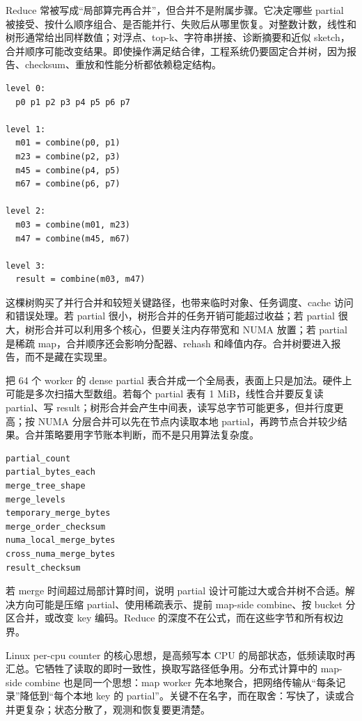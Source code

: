 Reduce 常被写成“局部算完再合并”，但合并不是附属步骤。它决定哪些 partial 被接受、按什么顺序组合、是否能并行、失败后从哪里恢复。对整数计数，线性和树形通常给出同样数值；对浮点、top-k、字符串拼接、诊断摘要和近似 sketch，合并顺序可能改变结果。即使操作满足结合律，工程系统仍要固定合并树，因为报告、checksum、重放和性能分析都依赖稳定结构。

\begin{lstlisting}[numbers=none,caption={8 个 partial 的固定树形合并}]
level 0:
  p0 p1 p2 p3 p4 p5 p6 p7

level 1:
  m01 = combine(p0, p1)
  m23 = combine(p2, p3)
  m45 = combine(p4, p5)
  m67 = combine(p6, p7)

level 2:
  m03 = combine(m01, m23)
  m47 = combine(m45, m67)

level 3:
  result = combine(m03, m47)
\end{lstlisting}

这棵树购买了并行合并和较短关键路径，也带来临时对象、任务调度、cache 访问和错误处理。若 partial 很小，树形合并的任务开销可能超过收益；若 partial 很大，树形合并可以利用多个核心，但要关注内存带宽和 NUMA 放置；若 partial 是稀疏 map，合并顺序还会影响分配器、rehash 和峰值内存。合并树要进入报告，而不是藏在实现里。

把 64 个 worker 的 dense partial 表合并成一个全局表，表面上只是加法。硬件上可能是多次扫描大型数组。若每个 partial 表有 1 MiB，线性合并要反复读 partial、写 result；树形合并会产生中间表，读写总字节可能更多，但并行度更高；按 NUMA 分层合并可以先在节点内读取本地 partial，再跨节点合并较少结果。合并策略要用字节账本判断，而不是只用算法复杂度。

\begin{lstlisting}[numbers=none,caption={partial 合并报告字段}]
partial_count
partial_bytes_each
merge_tree_shape
merge_levels
temporary_merge_bytes
merge_order_checksum
numa_local_merge_bytes
cross_numa_merge_bytes
result_checksum
\end{lstlisting}

若 merge 时间超过局部计算时间，说明 partial 设计可能过大或合并树不合适。解决方向可能是压缩 partial、使用稀疏表示、提前 map-side combine、按 bucket 分区合并，或改变 key 编码。Reduce 的深度不在公式，而在这些字节和所有权边界。

Linux per-cpu counter 的核心思想，是高频写本 CPU 的局部状态，低频读取时再汇总。它牺牲了读取的即时一致性，换取写路径低争用。分布式计算中的 map-side combine 也是同一个思想：map worker 先本地聚合，把网络传输从“每条记录”降低到“每个本地 key 的 partial”。关键不在名字，而在取舍：写快了，读或合并更复杂；状态分散了，观测和恢复要更清楚。

